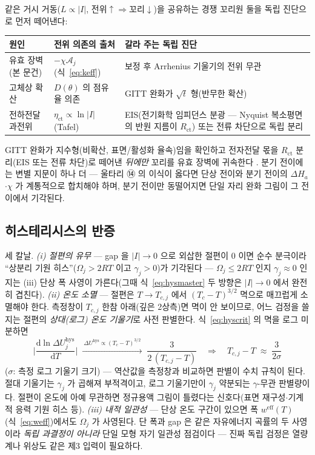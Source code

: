 \documentclass[11pt,a4paper]{article}
\newcommand{\dd}{\mathrm{d}}
\newcommand{\eff}{\mathrm{eff}}
\newcommand{\hys}{\mathrm{hys}}
\begin{document}
같은 거시 거동($L\propto|I|$, 전위$\uparrow\Rightarrow$꼬리$\downarrow$)을 공유하는 경쟁 꼬리원 둘을 독립 진단으로 먼저 떼어낸다:
\begin{center}
\renewcommand{\arraystretch}{1.35}
\begin{tabular}{p{} p{} p{}}
\toprule
원인 & 전위 의존의 출처 & 갈라 주는 독립 진단 \\
\midrule
유효 장벽(본 문건) & $-\chi\mathcal A_j$(식~\eqref{eq:keff}) & 보정 후 Arrhenius 기울기의 전위 무관 \\
고체상 확산 & $D(\theta)$ 의 점유율 의존 & GITT 완화가 $\sqrt t$ 형(반무한 확산) \\
전하전달 과전위 & $\eta_{\mathrm{ct}}\propto\ln|I|$(Tafel) & EIS(전기화학 임피던스 분광 — Nyquist
복소평면의 반원 지름이 $R_{\mathrm{ct}}$) 또는 전류 차단으로 독립 분리 \\
\bottomrule
\end{tabular}
\end{center}
GITT 완화가 지수형(비확산, 표면/활성화 율속)임을 확인하고 전자전달 몫을 $R_{\mathrm{ct}}$ 분리(EIS 또는 전류 차단)로 떼어낸 \emph{뒤에만} 꼬리를 유효 장벽에 귀속한다 \cite{weppner1977,bardfaulkner}. 분기 전이에는 변별 지문이 하나 더 — 울타리 ⑭ 의 이식이 옳다면 단상 전이와 분기 전이의 $\Delta H_{a}$$\cdot$$\chi$ 가 계통적으로 합치해야 하며, 분기 전이만 동떨어지면 단일 자리 완화 그림이 그 전이에서 기각된다.

\subsection{히스테리시스의 반증}
세 칼날. \emph{(i) 절편의 유무} — gap 을 $|I|\to0$ 으로 외삽한 절편이 $0$ 이면 순수 분극이라 ``상분리 기원 히스''($\Omega_j>2RT$ 이고 $\gamma_j>0$)가 기각된다 — $\Omega_j\le2RT$ 인지 $\gamma_j\approx0$ 인지는 (iii) 단상 폭 사영이 가른다(그때 식~\eqref{eq:hysmaster} 두 방향은 $|I|\to0$ 에서 완전히 겹친다).
\emph{(ii) 온도 소멸} — 절편은 $T\to T_{c,j}$ 에서 $(T_c-T)^{3/2}$ 멱으로 매끄럽게 소멸해야 한다. 측정창이 $T_{c,j}$ 한참 아래(깊은 2상측)면 멱이 안 보이므로, 어느 검정을 쓸지는 절편의 \emph{상대(로그) 온도 기울기}로 사전 판별한다. 식~\eqref{eq:hyscrit} 의 멱을 로그 미분하면
\begin{equation}
\bigg|\frac{\dd\ln\Delta U_j^\hys}{\dd T}\bigg|
\;\xrightarrow{\ \Delta U^\hys\propto(T_{c}-T)^{3/2}\ }\;
\frac{3}{2\,(T_{c,j}-T)}
\quad\Longrightarrow\quad
T_{c,j}-T\;\approx\;\frac{3}{2\sigma}
\label{eq:logslopeT}
\end{equation}
($\sigma$: 측정 로그 기울기 크기) — 역산값을 측정창과 비교하면 판별이 수치 규칙이 된다. 절대 기울기는 $\gamma_j$ 가 곱해져 부적격이고, 로그 기울기만이 $\gamma_j$ 약분되는 $\gamma$-무관 판별량이다. 절편이 온도에 아예 무관하면 정규용액 그림이 틀렸다는 신호다(표면 재구성$\cdot$기계적 응력 기원 히스 등).
\emph{(iii) 내적 일관성} — 단상 온도 구간이 있으면 폭 $w^{\eff}(T)$(식~\eqref{eq:weff})에서도 $\Omega_j$ 가 사영된다. 단 폭과 gap 은 같은 자유에너지 곡률의 두 사영이라 \emph{독립 과결정이 아니라} 단일 모형 자기 일관성 점검이다 — 진짜 독립 검정은 열량계나 위상도 같은 제3 입력이 필요하다.
\end{document}
